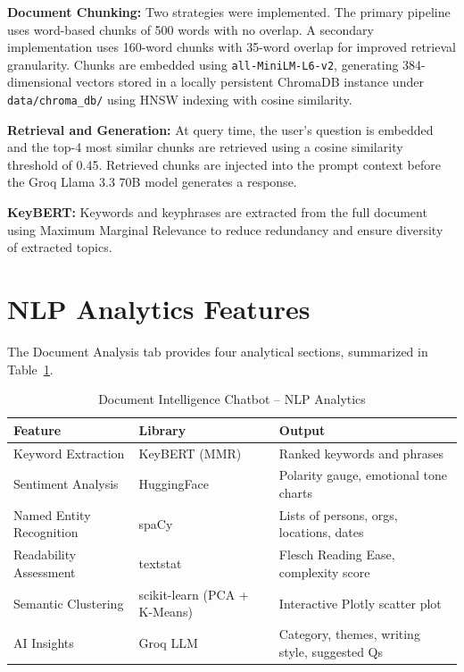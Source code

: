 \documentclass{book}
\begin{document}
\par\noindent \textbf{Document Chunking:} Two strategies were implemented. The primary pipeline uses word-based chunks of 500 words with no overlap. A secondary implementation uses 160-word chunks with 35-word overlap for improved retrieval granularity. Chunks are embedded using \texttt{all-MiniLM-L6-v2}, generating 384-dimensional vectors stored in a locally persistent ChromaDB instance under \texttt{data/chroma\_db/} using HNSW indexing with cosine similarity.

\par\noindent \textbf{Retrieval and Generation:} At query time, the user's question is embedded and the top-4 most similar chunks are retrieved using a cosine similarity threshold of 0.45. Retrieved chunks are injected into the prompt context before the Groq Llama 3.3 70B model generates a response.

\par\noindent \textbf{KeyBERT:} Keywords and keyphrases are extracted from the full document using Maximum Marginal Relevance to reduce redundancy and ensure diversity of extracted topics.

\section{NLP Analytics Features}

\par\noindent The Document Analysis tab provides four analytical sections, summarized in Table~\ref{tab:meow_analytics}.

\begin{table}[!h]
\begin{center}
\small
\begin{tabular}{|l|l|l|}
\hline
\textbf{Feature} & \textbf{Library} & \textbf{Output} \\
\hline
Keyword Extraction & KeyBERT (MMR) & Ranked keywords and phrases \\
Sentiment Analysis & HuggingFace & Polarity gauge, emotional tone charts \\
Named Entity Recognition & spaCy & Lists of persons, orgs, locations, dates \\
Readability Assessment & textstat & Flesch Reading Ease, complexity score \\
Semantic Clustering & scikit-learn (PCA + K-Means) & Interactive Plotly scatter plot \\
AI Insights & Groq LLM & Category, themes, writing style, suggested Qs \\
\hline
\end{tabular}
\caption{Document Intelligence Chatbot -- NLP Analytics}
\label{tab:meow_analytics}
\end{center}
\end{table}
\end{document}
